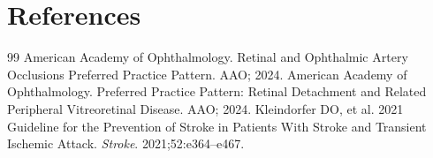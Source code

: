 \section*{References}
\begin{thebibliography}{99}
 American Academy of Ophthalmology. Retinal and Ophthalmic Artery Occlusions Preferred Practice Pattern. AAO; 2024.
 American Academy of Ophthalmology. Preferred Practice Pattern: Retinal Detachment and Related Peripheral Vitreoretinal Disease. AAO; 2024.
 Kleindorfer DO, et al. 2021 Guideline for the Prevention of Stroke in Patients With Stroke and Transient Ischemic Attack. \textit{Stroke}. 2021;52:e364--e467.
\end{thebibliography}
